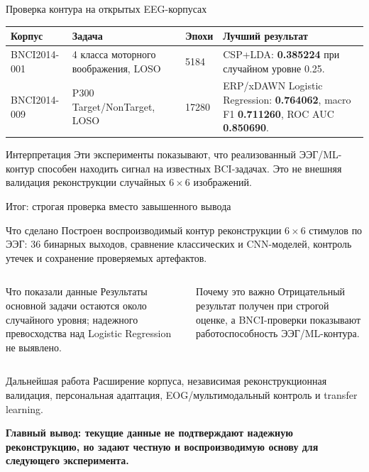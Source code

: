 \documentclass[aspectratio=169,10pt]{beamer}
\newcommand{\metric}[1]{\textcolor{ThesisBlue}{\textbf{#1}}}
\begin{document}
\begin{frame}{Проверка контура на открытых EEG-корпусах}
  \small
  \begin{tabularx}{\textwidth}{@{}lYlY@{}}
    \toprule
    Корпус & Задача & Эпохи & Лучший результат \\
    \midrule
    BNCI2014-001 & 4 класса моторного воображения, LOSO & 5184 & CSP+LDA: \metric{0.385224} при случайном уровне 0.25. \\
    BNCI2014-009 & P300 Target/NonTarget, LOSO & 17280 & ERP/xDAWN Logistic Regression: \metric{0.764062}, macro F1 \metric{0.711260}, ROC AUC \metric{0.850690}. \\
    \bottomrule
  \end{tabularx}
  \vspace{0.8em}
  \begin{block}{Интерпретация}
    Эти эксперименты показывают, что реализованный ЭЭГ/ML-контур способен находить сигнал на известных BCI-задачах. Это не внешняя валидация реконструкции случайных $6\times6$ изображений.
  \end{block}
\end{frame}

\begin{frame}{Итог: строгая проверка вместо завышенного вывода}
  \begin{block}{Что сделано}
    Построен воспроизводимый контур реконструкции $6\times6$ стимулов по ЭЭГ: 36 бинарных выходов, сравнение классических и CNN-моделей, контроль утечек и сохранение проверяемых артефактов.
  \end{block}

  \vspace{0.25em}
  \begin{columns}[T,totalwidth=\textwidth]
    \begin{column}{0.48\textwidth}
      \begin{block}{Что показали данные}
        \small
        Результаты основной задачи остаются около случайного уровня; надежного превосходства над Logistic Regression не выявлено.
      \end{block}
    \end{column}
    \begin{column}{0.48\textwidth}
      \begin{block}{Почему это важно}
        \small
        Отрицательный результат получен при строгой оценке, а BNCI-проверки показывают работоспособность ЭЭГ/ML-контура.
      \end{block}
    \end{column}
  \end{columns}

  \vspace{0.45em}
  \begin{block}{Дальнейшая работа}
    Расширение корпуса, независимая реконструкционная валидация, персональная адаптация, EOG/мультимодальный контроль и transfer learning.
  \end{block}

  \vspace{0.35em}
  \centering
  \textbf{Главный вывод: текущие данные не подтверждают надежную реконструкцию, но задают честную и воспроизводимую основу для следующего эксперимента.}
\end{frame}
\end{document}
